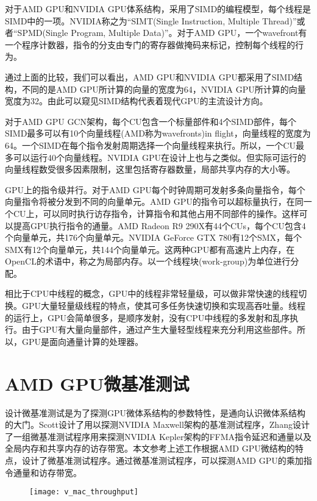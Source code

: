 对于AMD GPU和NVIDIA GPU体系结构，采用了SIMD的编程模型，每个线程是SIMD中的一项。NVIDIA称之为“SIMT(Single Instruction, Multiple Thread)”或者“SPMD(Single Program, Multiple Data)”。对于AMD GPU，一个wavefront有一个程序计数器，指令的分支由专门的寄存器做掩码来标记，控制每个线程的行为。

通过上面的比较，我们可以看出，AMD GPU和NVIDIA GPU都采用了SIMD结构，不同的是AMD GPU所计算的向量的宽度为64，NVIDIA GPU所计算的向量宽度为32。由此可以窥见SIMD结构代表着现代GPU的主流设计方向。

对于AMD GPU GCN架构，每个CU包含一个标量部件和4个SIMD部件，每个SIMD最多可以有10个向量线程(AMD称为wavefronts)in flight，向量线程的宽度为64。一个SIMD在每个指令发射周期选择一个向量线程来执行。所以，一个CU最多可以运行40个向量线程。NVIDIA GPU在设计上也与之类似。但实际可运行的向量线程数受很多因素限制，这里包括寄存器数量，局部共享内存的大小等。

GPU上的指令级并行。对于AMD GPU每个时钟周期可发射多条向量指令，每个向量指令将被分发到不同的向量单元。AMD GPU的指令可以超标量执行，在同一个CU上，可以同时执行访存指令，计算指令和其他占用不同部件的操作。这样可以提高GPU执行指令的通量。AMD Radeon R9 290X有44个CUs，每个CU包含4个向量单元，共176个向量单元。NVIDIA GeForce GTX 780有12个SMX，每个SMX有12个向量单元，共144个向量单元。这两种GPU都有高速片上内存，在OpenCL的术语中，称之为局部内存。以一个线程块(work-group)为单位进行分配。

相比于CPU中线程的概念，GPU中的线程非常轻量级，可以做非常快速的线程切换。GPU大量轻量级线程的特点，使其可多任务快速切换和实现高吞吐量。线程的运行上，GPU会简单很多，是顺序发射，没有CPU中线程的多发射和乱序执行。由于GPU有大量向量部件，通过产生大量轻型线程来充分利用这些部件。所以，GPU是面向通量计算的处理器。


\section{AMD GPU微基准测试}
设计微基准测试是为了探测GPU微体系结构的参数特性，是通向认识微体系结构的大门。Scott设计了用以探测NVIDIA Maxwell架构的基准测试程序，Zhang设计了一组微基准测试程序用来探测NVIDIA Kepler架构的FFMA指令延迟和通量以及全局内存和共享内存的访存带宽。本文参考上述工作根据AMD GPU微结构的特点，设计了微基准测试程序。通过微基准测试程序，可以探测AMD GPU的乘加指令通量和访存带宽。


\begin{figure}[htbp]
	\centering
	\texttt{[image: v\_mac\_throughput]}
	\label{fig:v_mac_throughput}
\end{figure}

